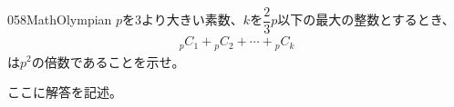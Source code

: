 \begin{thm}{058}{}{MathOlympian}
 $p$を3より大きい素数、$k$を$\dfrac{2}{3}p$以下の最大の整数とするとき、
 \begin{align*}
  {}_pC_1+{}_pC_2+\cdots+{}_pC_k
 \end{align*}
 は$p^2$の倍数であることを示せ。
\end{thm}

ここに解答を記述。